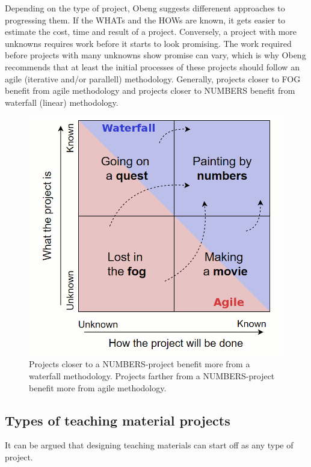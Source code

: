 Depending on the type of project, Obeng suggests differenent approaches to progressing them. If the WHATs and the HOWs are known, it gets easier to estimate the cost, time and result of a project. Conversely, a project with more unknowns requires work before it starts to look promising. The work required before projects with many unknowns show promise can vary, which is why Obeng recommends that at least the initial processes of these projects should follow an agile (iterative and/or parallell) methodology. Generally, projects closer to FOG benefit from agile methodology and projects closer to NUMBERS benefit from waterfall (linear) methodology.

\begin{figure}[H]
\hspace*{-1cm}
\centering
\includegraphics[scale=0.35]{figure/obeng3.png}
\caption{Projects closer to a NUMBERS-project benefit more from a waterfall methodology. Projects farther from a NUMBERS-project benefit more from agile methodology.}
\label{obeng3}
\end{figure}


\subsection{Types of teaching material projects}
It can be argued that designing teaching materials can start off as any type of project. 

